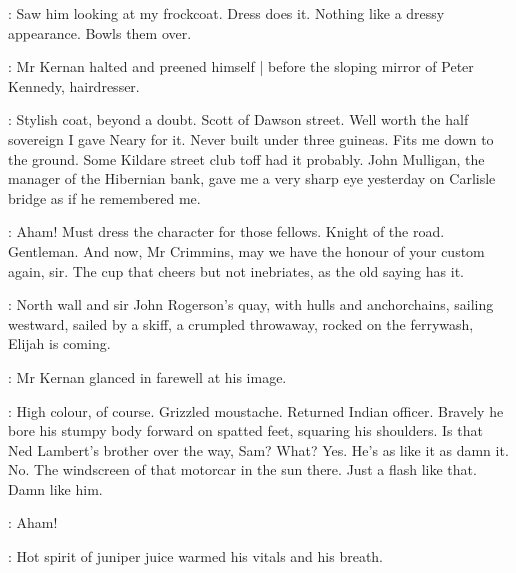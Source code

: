 :
Saw him looking at my frockcoat.
Dress does it.
Nothing like a dressy appearance.
Bowls them over.


:
Mr Kernan halted and preened himself |
before the sloping mirror of Peter Kennedy, hairdresser.

:
Stylish coat, beyond a doubt.
Scott of Dawson street.
Well worth the half sovereign I gave Neary for it.
Never built under three guineas.
Fits me down to the ground.
Some Kildare street club toff had it probably.
John Mulligan, the manager of the Hibernian bank,
gave me a very sharp eye yesterday
on Carlisle bridge as if he remembered me.

:
Aham!
Must dress the character for those fellows.
Knight of the road.
Gentleman.
And now, Mr Crimmins,
may we have the honour of your custom again, sir.
The cup that cheers but not inebriates,
as the old saying has it.

\begin{mdframed}
    :
    North wall and sir John Rogerson's quay,
    with hulls and anchorchains,
    sailing westward,
    sailed by a skiff,
    a crumpled throwaway,
    rocked on the ferrywash,
    Elijah is coming.
\end{mdframed}

:
Mr Kernan glanced in farewell at his image.

:
High colour, of course.
Grizzled moustache.
Returned Indian officer.
Bravely he bore his stumpy body forward on spatted feet,
squaring his shoulders.
Is that Ned Lambert's brother over the way, Sam?
What?
Yes.
He's as like it as damn it.
No.
The windscreen of that motorcar in the sun there.
Just a flash like that.
Damn like him.%

:
Aham!

:
Hot spirit of juniper juice warmed his vitals and his breath.

